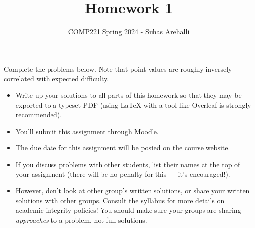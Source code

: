 \documentclass{exam}
\title{Homework 1}
\author{COMP221 Spring 2024 - Suhas Arehalli}
\date{}
\begin{document}
\maketitle

Complete the problems below. Note that point values are roughly inversely correlated with expected difficulty.

\begin{itemize}
    \item Write up your solutions to all parts of this homework so that they may be exported to a typeset PDF (using LaTeX with a tool like Overleaf is strongly recommended).
    \item You'll submit this assignment through Moodle.
    \item The due date for this assignment will be posted on the course website.
    \item If you discuss problems with other students, list their names at the top of your assignment (there will be no penalty for this --- it's encouraged!).
    \item However, don't look at other group's written solutions, or share your written solutions with other groups. Consult the syllabus for more details on academic integrity policies! You should make sure your groups are sharing \textit{approaches} to a problem, not full solutions. 
\end{itemize}   
\end{document}
